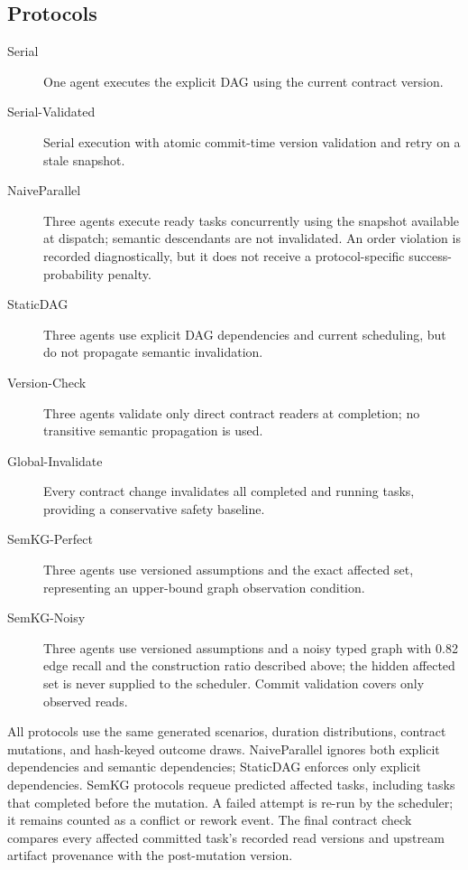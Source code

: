 \documentclass[a4paper,runningheads]{llncs}
\begin{document}
\subsection{Protocols}
\begin{description}
\item[Serial] One agent executes the explicit DAG using the current contract version.
\item[Serial-Validated] Serial execution with atomic commit-time version validation and retry on a stale snapshot.
\item[NaiveParallel] Three agents execute ready tasks concurrently using the snapshot available at dispatch; semantic descendants are not invalidated. An order violation is recorded diagnostically, but it does not receive a protocol-specific success-probability penalty.
\item[StaticDAG] Three agents use explicit DAG dependencies and current scheduling, but do not propagate semantic invalidation.
\item[Version-Check] Three agents validate only direct contract readers at completion; no transitive semantic propagation is used.
\item[Global-Invalidate] Every contract change invalidates all completed and running tasks, providing a conservative safety baseline.
\item[SemKG-Perfect] Three agents use versioned assumptions and the exact affected set, representing an upper-bound graph observation condition.
\item[SemKG-Noisy] Three agents use versioned assumptions and a noisy typed graph with 0.82 edge recall and the construction ratio described above; the hidden affected set is never supplied to the scheduler. Commit validation covers only observed reads.
\end{description}

All protocols use the same generated scenarios, duration distributions, contract mutations, and hash-keyed outcome draws. NaiveParallel ignores both explicit dependencies and semantic dependencies; StaticDAG enforces only explicit dependencies. SemKG protocols requeue predicted affected tasks, including tasks that completed before the mutation. A failed attempt is re-run by the scheduler; it remains counted as a conflict or rework event. The final contract check compares every affected committed task's recorded read versions and upstream artifact provenance with the post-mutation version.
\end{document}

